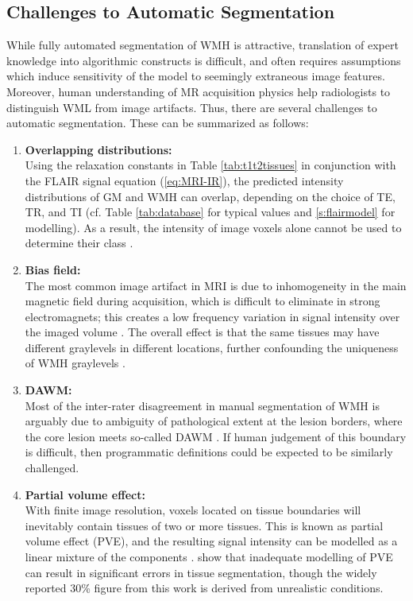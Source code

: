 \subsection{Challenges to Automatic Segmentation}\label{ss:autochallenges}
While fully automated segmentation of WMH is attractive, translation of expert knowledge into algorithmic constructs is difficult, and often requires assumptions which induce sensitivity of the model to seemingly extraneous image features. Moreover, human understanding of MR acquisition physics help radiologists to distinguish WML from image artifacts. Thus, there are several challenges to automatic segmentation. These can be summarized as follows:
\begin{enumerate}[itemsep=0pt,topsep=0pt]
  \item \label{chauto:overlap}     \textbf{Overlapping distributions:} \\
  Using the relaxation constants in Table \ref{tab:t1t2tissues} in conjunction with the FLAIR signal equation (\ref{eq:MRI-IR}), the predicted intensity distributions of GM and WMH can overlap, depending on the choice of TE, TR, and TI (cf. Table \ref{tab:database} for typical values and \ref{s:flairmodel} for modelling). As a result, the intensity of image voxels alone cannot be used to determine their class \cite{Mortazavi2012}.
  \item \label{chauto:bias}        \textbf{Bias field:} \\
  The most common image artifact in MRI is due to inhomogeneity in the main magnetic field during acquisition, which is difficult to eliminate in strong electromagnets; this creates a low frequency variation in signal intensity over the imaged volume \cite{Juntu2005}. The overall effect is that the same tissues may have different graylevels in different locations, further confounding the uniqueness of WMH graylevels \cite{Wardlaw2015}.
  \item \label{chauto:dawm}        \textbf{DAWM:} \\
  Most of the inter-rater disagreement in manual segmentation of WMH is arguably due to ambiguity of pathological extent at the lesion borders, where the core lesion meets so-called DAWM \cite{Ge2003}. If human judgement of this boundary is difficult, then programmatic definitions could be expected to be similarly challenged.
  \item \label{chauto:pva}         \textbf{Partial volume effect:} \\
  With finite image resolution, voxels located on tissue boundaries will inevitably contain tissues of two or more tissues. This is known as partial volume effect (PVE), and the resulting signal intensity can be modelled as a linear mixture of the components \cite{Santago1995}. \citeauthor{Niessen1999} \cite{Niessen1999} show that inadequate modelling of PVE can result in significant errors in tissue segmentation, though the widely reported 30\% figure from this work is derived from unrealistic conditions.

\end{enumerate}
